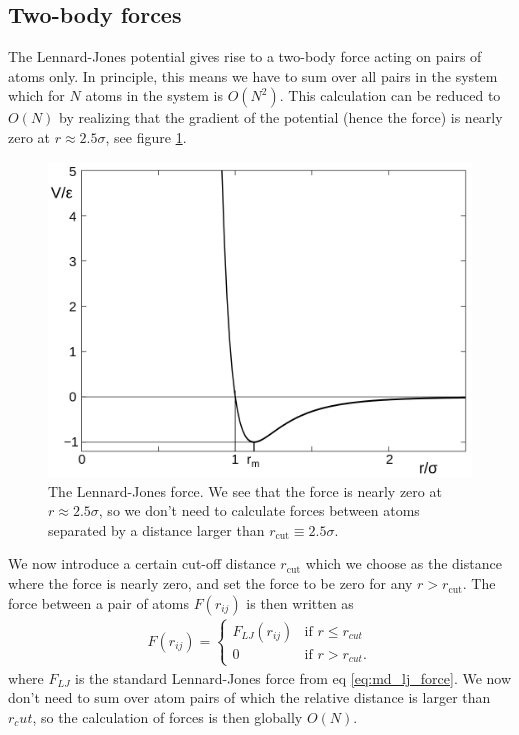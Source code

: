 \subsection{Two-body forces}
\label{sec:md_implementation_two_body_forces}
The Lennard-Jones potential gives rise to a two-body force acting on pairs of atoms only. In principle, this means we have to sum over all pairs in the system which for $N$ atoms in the system is $O(N^2)$. This calculation can be reduced to $O(N)$ by realizing that the gradient of the potential (hence the force) is nearly zero at $r \approx 2.5\sigma$, see figure \ref{fig:md_lennard_jones_2}. 
\begin{figure}[h]
\begin{center}
\includegraphics[width=1.0\textwidth, trim=0cm 0cm 0cm 0cm, clip]{MD/figures/lennard_jones.png}
\end{center}
\caption{The Lennard-Jones force. We see that the force is nearly zero at $r\approx 2.5\sigma$, so we don't need to calculate forces between atoms separated by a distance larger than $r_\text{cut} \equiv 2.5\sigma$.}
\label{fig:md_lennard_jones_2}
\end{figure}
We now introduce a certain cut-off distance $r_\text{cut}$ which we choose as the distance where the force is nearly zero, and set the force to be zero for any $r>r_\text{cut}$. The force between a pair of atoms $F(r_{ij})$ is then written as
\begin{align}
	F(r_{ij}) = \left\{\begin{array}{cc}
		F_{LJ}(r_{ij}) & \text{if } r \leq r_{cut}\\
		0 & \text{if } r > r_{cut}.
	\end{array}
	\right.
\end{align}
where $F_{LJ}$ is the standard Lennard-Jones force from eq \eqref{eq:md_lj_force}. We now don't need to sum over atom pairs of which the relative distance is larger than $r_cut$, so the calculation of forces is then globally $O(N)$. 
